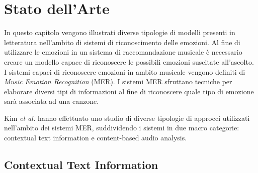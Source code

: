 \documentclass[11pt]{report}
\begin{document}
\chapter{Stato dell'Arte}

In questo capitolo vengono illustrati diverse tipologie di modelli presenti in letteratura nell'ambito di sistemi di riconoscimento delle emozioni. Al fine di utilizzare le emozioni in un sistema di raccomandazione musicale è necessario creare un modello capace di riconoscere le possibili emozioni suscitate all'ascolto. I sistemi capaci di riconoscere emozioni in ambito musicale vengono definiti di \textit{Music Emotion Recognition} (MER). I sistemi MER sfruttano tecniche per elaborare diversi tipi di informazioni al fine di riconoscere quale tipo di emozione sarà associata ad una canzone.


Kim \textit{et al.} \cite{kim2010music} hanno effettuato uno studio di diverse tipologie di approcci utilizzati nell'ambito dei sistemi MER, suddividendo i sistemi in due macro categorie: contextual text information e content-based audio analysis.

\section{Contextual Text Information}
\end{document}
